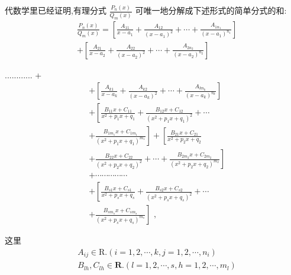 代数学里已经证明,有理分式 $\frac{{P}_{n}\left( x\right) }{{Q}_{m}\left( x\right) }$ 可唯一地分解成下述形式的简单分式的和:
\begin{align*}
	&\frac{{P}_{n}\left( x\right) }{{Q}_{m}\left( x\right) } = \left\lbrack  {\frac{{A}_{11}}{x - {a}_{1}} + \frac{{A}_{12}}{{\left( x - {a}_{1}\right) }^{2}} + \cdots  + \frac{{A}_{1{n}_{1}}}{{\left( x - {a}_{1}\right) }^{{n}_{1}}}}\right\rbrack\\
	&+ \left\lbrack  {\frac{{A}_{21}}{x - {a}_{2}} + \frac{{A}_{22}}{{\left( x - {a}_{2}\right) }^{2}} + \cdots  + \frac{{A}_{2{n}_{2}}}{{\left( x - {a}_{2}\right) }^{{n}_{2}}}}\right\rbrack
\end{align*}

............ +
\begin{align*}
	&+ \left\lbrack  {\frac{{A}_{k1}}{x - {a}_{k}} + \frac{{A}_{k2}}{{\left( x - {a}_{k}\right) }^{2}} + \cdots  + \frac{{A}_{k{n}_{k}}}{{\left( x - {a}_{k}\right) }^{{n}_{k}}}}\right\rbrack\\
	&+ \left\lbrack  {\frac{{B}_{11}x + {C}_{11}}{{x}^{2} + {p}_{1}x + {q}_{1}} + \frac{{B}_{12}x + {C}_{12}}{{\left( {x}^{2} + {p}_{1}x + {q}_{1}\right) }^{2}} + \cdots }\right.\\
	&\left. {+\frac{{B}_{1{m}_{1}}x + {C}_{1{m}_{1}}}{{\left( {x}^{2} + {p}_{1}x + {q}_{1}\right) }^{{m}_{1}}}}\right\rbrack   + \left\lbrack  \frac{{B}_{21}x + {C}_{21}}{{x}^{2} + {p}_{2}x + {q}_{2}}\right.\\
	&\left. {+\frac{{B}_{22}x + {C}_{22}}{{\left( {x}^{2} + {p}_{2}x + {q}_{2}\right) }^{2}} + \cdots  + \frac{{B}_{2{m}_{2}}x + {C}_{2{m}_{2}}}{{\left( {x}^{2} + {p}_{2}x + {q}_{2}\right) }^{{m}_{2}}}}\right\rbrack\\
	&+ \cdots \cdots \cdots \cdots \cdots\\
	&+ \left\lbrack  {\frac{{B}_{s1}x + {C}_{s1}}{{x}^{2} + {p}_{s}x + {q}_{s}} + \frac{{B}_{s2}x + {C}_{s2}}{{\left( {x}^{2} + {p}_{s}x + {q}_{s}\right) }^{2}} + \cdots }\right.\\
	&\left. {+\frac{{B}_{s{m}_{s}}x + {C}_{s{m}_{s}}}{{\left( {x}^{2} + {p}_{s}x + {q}_{s}\right) }^{{m}_{s}}}}\right\rbrack  \text{ , }
\end{align*}

这里
\begin{align*}
	&{A}_{ij} \in  \mathrm{R}.\left( {i = 1,2,\cdots ,k,j = 1,2,\cdots ,{n}_{i}}\right)\\
	&{B}_{lh},{C}_{lh} \in  \mathbf{R}.\left( {l = 1,2,\cdots ,s,h = 1,2,\cdots ,{m}_{l}}\right)
\end{align*}

